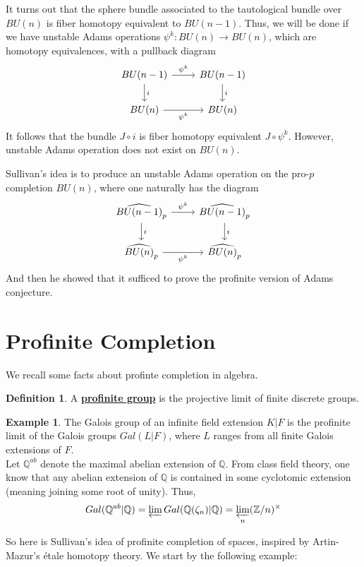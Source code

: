 \documentclass{article}
\theoremstyle{definition}
\theoremstyle{definition}
\newtheorem{definition}{Definition}[theorem]
\theoremstyle{definition}
\theoremstyle{definition}
\theoremstyle{definition}
\theoremstyle{definition}
\theoremstyle{definition}
\newtheorem{example}{Example}[theorem]
\begin{document}
It turns out that the sphere bundle associated to the tautological bundle over $BU(n)$ is fiber homotopy equivalent to $BU(n-1)$. Thus, we will be done if we have unstable Adams operations $\psi^k: BU(n)\to BU(n)$, which are homotopy equivalences, with a pullback diagram
\[\begin{tikzcd}
	{BU(n-1)} & {BU(n-1)} \\
	{BU(n)} & {BU(n)}
	\arrow["{\psi^k}", from=1-1, to=1-2]
	\arrow["i", from=1-1, to=2-1]
	\arrow["i", from=1-2, to=2-2]
	\arrow["{\psi^k}"', from=2-1, to=2-2]
\end{tikzcd}\]
It follows that the bundle $J\circ i$ is fiber homotopy equivalent $J\circ \psi^k$. However, unstable Adams operation does not exist on $BU(n)$.



Sullivan's idea is to produce an unstable Adams operation on the pro-$p$ completion $BU(n)$, where one naturally has the diagram
\[\begin{tikzcd}
	{\widehat{BU(n-1)}_p} & {\widehat{BU(n-1)}_p} \\
	{\widehat{BU(n)}_p} & {\widehat{BU(n)}_p}
	\arrow["{\psi^k}", from=1-1, to=1-2]
	\arrow["i", from=1-1, to=2-1]
	\arrow["i", from=1-2, to=2-2]
	\arrow["{\psi^k}"', from=2-1, to=2-2]
\end{tikzcd}\]
And then he showed that it sufficed to prove the profinite version of Adams conjecture. 



\section{Profinite Completion}
We recall some facts about profinte completion in algebra.  
\begin{tcolorbox}[colback=purple!5!white,colframe=purple!75!black]
\begin{definition}
A \underline{\textbf{profinite group}} is the projective limit of finite discrete groups.
\end{definition}
\end{tcolorbox}


\begin{tcolorbox}[colback=yellow!5!white,colframe=yellow!30!white]
\begin{example}
The Galois group of an infinite field extension $K|F$ is the profinite limit of the Galois groups $Gal(L|F)$, where $L$ ranges from all finite Galois extensions of $F$. \\

Let $\mathbb{Q}^{ab}$ denote the maximal abelian extension of $\mathbb{Q}$. From class field theory, one know that any abelian extension of $\mathbb{Q}$ is contained in some cyclotomic extension (meaning joining some root of unity). Thus, 
\[Gal(\mathbb{Q}^{ab}|\mathbb{Q})=\varprojlim Gal(\mathbb{Q}(\zeta_{n})|\mathbb{Q})=\varprojlim_n (\mathbb{Z}/n)^{\times}\]
\end{example}
\end{tcolorbox}
So here is Sullivan's idea of profinite completion of spaces, inspired by Artin-Mazur's 
\'etale homotopy theory. We start by the following example:
\end{document}
